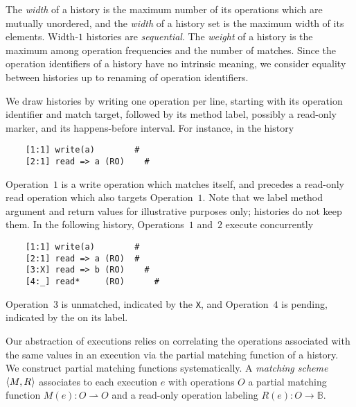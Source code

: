 The \emph{width} of a history is the maximum number of its operations which are
mutually unordered, and the \emph{width} of a history set is the maximum width
of its elements. Width-$1$ histories are \emph{sequential}. The \emph{weight}
of a history is the maximum among operation frequencies and the number of
matches. Since the operation identifiers of a history have no intrinsic
meaning, we consider equality between histories up to renaming of operation
identifiers.

\begin{example}
  \label{ex:histories}

  We draw histories by writing one operation per line, starting with its
  operation identifier and match target, followed by its method label,
  possibly a read-only marker, and its happens-before interval. For instance,
  in the history
  \vspace{-1mm}
\begin{verbatim}
    [1:1] write(a)        #
    [2:1] read => a (RO)    #
\end{verbatim}
  \vspace{-1mm}
  Operation~$1$ is a write operation which matches itself, and precedes a
  read-only read operation which also targets Operation~$1$. Note that we
  label method argument and return values for illustrative purposes only;
  histories do not keep them. In the following history, Operations~$1$ and~$2$
  execute concurrently
    \vspace{-1mm}
\begin{verbatim}
    [1:1] write(a)        #
    [2:1] read => a (RO)  #
    [3:X] read => b (RO)    #
    [4:_] read*     (RO)      #
\end{verbatim}
  \vspace{-1mm}
  Operation~$3$ is unmatched, indicated by the {\tt X}, and Operation~$4$ is
  pending, indicated by the {\tt *} on its label.

\end{example}

Our abstraction of executions relies on correlating the operations associated
with the same values in an execution via the partial matching function of a
history. We construct partial matching functions systematically. A
\emph{matching scheme} ${\left\langle{M,R}\right\rangle}$ associates to each execution $e$ with
operations $O$ a partial matching function $M(e): O \rightharpoonup O$ and a
read-only operation labeling $R(e): O \to \mathbb{B}$.

